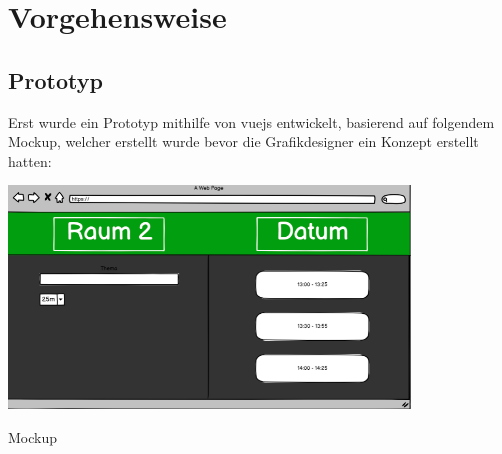 
\pagebreak
\section{Vorgehensweise}\label{sec:vorgehensweise}

\subsection{Prototyp}\label{subsec:prototyp}
Erst wurde ein Prototyp mithilfe von vuejs entwickelt, basierend auf folgendem Mockup, welcher erstellt wurde bevor die Grafikdesigner ein Konzept erstellt hatten:
\par\vspace{1cm}
    \centering
    \includegraphics[width=0.8\textwidth]{Bilder/mockup}
    \caption{Mockup}
    \label{fig:Mockup}
\par\vspace{1cm}
\raggedright